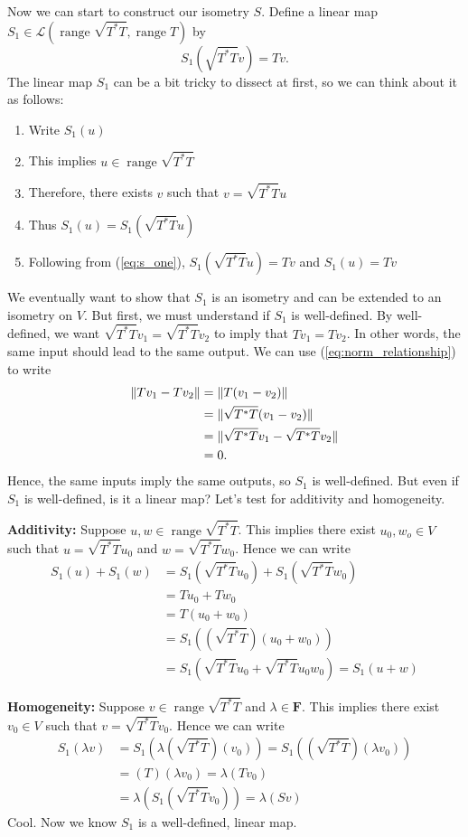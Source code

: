 \documentclass{article}
\begin{document}
Now we can start to construct our isometry $S$. Define a linear map $S_1\in\mathcal{L}(\operatorname{range}\sqrt{T^*T},\operatorname{range}T)$ by
\begin{equation}\label{eq:s_one}
    S_1(\sqrt{T^*T}v)=Tv.
\end{equation}
The linear map $S_1$ can be a bit tricky to dissect at first, so we can think about it as follows:
\begin{enumerate}
    \item Write $S_1(u)$
    \item This implies $u\in\operatorname{range}\sqrt{T^*T}$
    \item Therefore, there exists $v$ such that $v = \sqrt{T^*T}u$
    \item Thus $S_1(u)=S_1(\sqrt{T^*T}u)$
    \item Following from (\ref{eq:s_one}), $S_1(\sqrt{T^*T}u)=Tv$ and $S_1(u)=Tv$
\end{enumerate}
We eventually want to show that $S_1$ is an isometry and can be extended to an isometry on $V$. But first, we must understand if $S_1$ is well-defined. By well-defined, we want $\sqrt{T^*T}v_1=\sqrt{T^*T}v_2$ to imply that $Tv_1=Tv_2$. In other words, the same input should lead to the same output. We can use (\ref{eq:norm_relationship}) to write
\begin{align*}
    \lVert Tv_1-Tv_2\rVert&=\lVert T(v_1-v_2)\rVert\\
    &=\lVert\sqrt{T^*T}(v_1-v_2)\rVert \\
    &=\lVert\sqrt{T^*T}v_1-\sqrt{T^*T}v_2\rVert\\
    &=0.
\end{align*}
Hence, the same inputs imply the same outputs, so $S_1$ is well-defined. But even if $S_1$ is well-defined, is it a linear map? Let's test for additivity and homogeneity.

\textbf{Additivity:} Suppose $u,w\in\operatorname{range}\sqrt{T^*T}$. This implies there exist $u_0,w_o\in V$ such that $u=\sqrt{T^*T}u_0$ and $w=\sqrt{T^*T}w_0$. Hence we can write
\begin{align*}
    S_1(u)+S_1(w)&=S_1(\sqrt{T^*T}u_0) + S_1(\sqrt{T^*T}w_0)\\
    &= Tu_0+Tw_0 \\
    &= T(u_0+w_0) \\
    &= S_1((\sqrt{T^*T})(u_0+w_0))\\
    &=S_1(\sqrt{T^*T}u_0+\sqrt{T^*T}u_0w_0)=S_1(u+w)
\end{align*}

\textbf{Homogeneity:} Suppose $v\in\operatorname{range}\sqrt{T^*T}$ and $\lambda\in\mathbf{F}$. This implies there exist $v_0\in V$ such that $v=\sqrt{T^*T}v_0$. Hence we can write
\begin{align*}
    S_1(\lambda v)&=S_1(\lambda (\sqrt{T^*T})(v_0))=S_1((\sqrt{T^*T})(\lambda v_0))\\
    &=(T)(\lambda v_0)=\lambda(Tv_0)\\
    &=\lambda(S_1(\sqrt{T^*T}v_0))=\lambda(Sv)
\end{align*}
Cool. Now we know $S_1$ is a well-defined, linear map.
\end{document}
